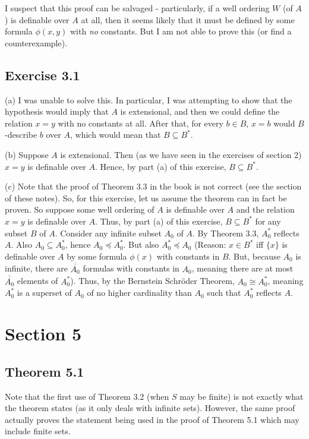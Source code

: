\documentclass{article}
\theoremstyle{definition}
\begin{document}
I suspect that this proof can be salvaged - particularly, if a well ordering $W$ (of $A$) is definable over $A$
at all, then it seems likely that it must be defined by some formula $\phi(x,y)$ with \textit{no} constants. But I am 
not able to prove this (or find a counterexample).

\subsection*{Exercise 3.1}
(a) I was unable to solve this. In particular, I was attempting to show that the hypothesis would imply that $A$ is 
extensional, and then we could define the relation $x=y$ with no constants at all. After that, for 
every $b\in B$, $x=b$ would $B$-describe $b$ over $A$, which would mean that $B\subseteq B^*$.

(b) Suppose $A$ is extensional. Then (as we have seen in the exercises of section 2) $x=y$ is definable over 
$A$. Hence, by part (a) of this exercise, $B\subseteq B^*$.

(c) Note that the proof of Theorem 3.3 in the book is not correct (see the section 
 of these notes). So, for this exercise, let us assume the theorem 
can in fact be proven. So suppose some well ordering of $A$ is definable over 
$A$ and the relation $x=y$ is definable over $A$. Thus, by part (a) of this exercise, $B\subseteq B^*$ for any subset 
$B$ of $A$. Consider any infinite subset $A_0$ of $A$. By Theorem 3.3, $A_0^*$ reflects $A$. Also 
$A_0\subseteq A_0^*$, hence $A_0\preceq A_0^*$. But also $A_0^*\preceq A_0$ (Reason: $x\in B^*$ iff  
$\{x\}$ is definable over $A$ by some formula $\phi(x)$ with constants in $B$. But, because 
$A_0$ is infinite, there are $\overline{\overline{A_0}}$ formulas with constants in $A_0$, meaning 
there are at most $\overline{\overline{A_0}}$ elements of $A_0^*$). Thus, by the Bernstein Schröder Theorem, 
$A_0\cong A_0^*$, meaning $A_0^*$ is a superset of $A_0$ of no higher cardinality than $A_0$ such that 
$A_0^*$ reflects $A$.

\section*{Section 5}

\subsection*{Theorem 5.1}
Note that the first use of Theorem 3.2 (when $S$ may be finite) is not exactly what 
the theorem states (as it only deals with infinite sets). However, the same proof actually 
proves the statement being used in the proof of Theorem 5.1 which may include finite sets.
\end{document}

